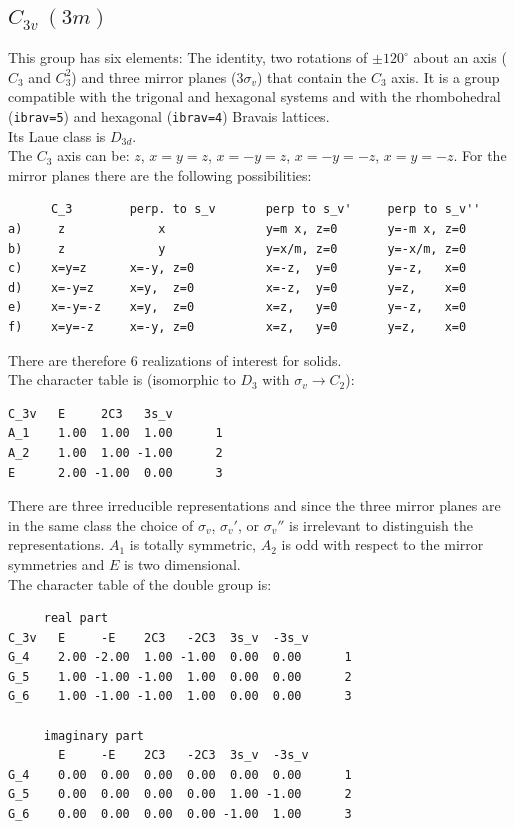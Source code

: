 \documentclass[12pt,a4paper]{article}
\begin{document}
\subsection{\color{web-blue}$C_{3v}\ (3m)$} 
This group has six elements: The identity, two rotations of $\pm120^\circ$ about
an axis ($C_3$ and $C_3^2$) and three mirror planes ($3\sigma_v$) 
that contain the $C_3$ axis.
It is a group compatible with the trigonal and hexagonal systems and with the  
rhombohedral (\texttt{ibrav=5}) and hexagonal (\texttt{ibrav=4}) Bravais lattices. \\ 
Its Laue class is $D_{3d}$. \\
The $C_3$ axis can be: $z$, $x=y=z$, $x=-y=z$, $x=-y=-z$, $x=y=-z$.
For the mirror planes there are the following possibilities:
\begin{verbatim}
      C_3        perp. to s_v       perp to s_v'     perp to s_v''
a)     z             x              y=m x, z=0       y=-m x, z=0
b)     z             y              y=x/m, z=0       y=-x/m, z=0
c)    x=y=z      x=-y, z=0          x=-z,  y=0       y=-z,   x=0
d)    x=-y=z     x=y,  z=0          x=-z,  y=0       y=z,    x=0
e)    x=-y=-z    x=y,  z=0          x=z,   y=0       y=-z,   x=0
f)    x=y=-z     x=-y, z=0          x=z,   y=0       y=z,    x=0
\end{verbatim}
There are therefore $6$ realizations of interest for solids. \\
The character table is (isomorphic to $D_3$ with $\sigma_v \rightarrow C_2$):
\begin{verbatim}
C_3v   E     2C3   3s_v
A_1    1.00  1.00  1.00      1
A_2    1.00  1.00 -1.00      2
E      2.00 -1.00  0.00      3
\end{verbatim}
There are three irreducible representations and since the three mirror planes
are in the same class the choice of $\sigma_v$, $\sigma_v'$, or $\sigma_v''$ is
irrelevant to distinguish the representations. $A_1$ is totally symmetric,
$A_2$ is odd with respect to the mirror symmetries and $E$ is two dimensional. \\
The character table of the double group is:
\begin{verbatim}
     real part
C_3v   E     -E    2C3   -2C3  3s_v  -3s_v
G_4    2.00 -2.00  1.00 -1.00  0.00  0.00      1
G_5    1.00 -1.00 -1.00  1.00  0.00  0.00      2
G_6    1.00 -1.00 -1.00  1.00  0.00  0.00      3

     imaginary part
       E     -E    2C3   -2C3  3s_v  -3s_v
G_4    0.00  0.00  0.00  0.00  0.00  0.00      1
G_5    0.00  0.00  0.00  0.00  1.00 -1.00      2
G_6    0.00  0.00  0.00  0.00 -1.00  1.00      3
\end{verbatim}
\end{document}
